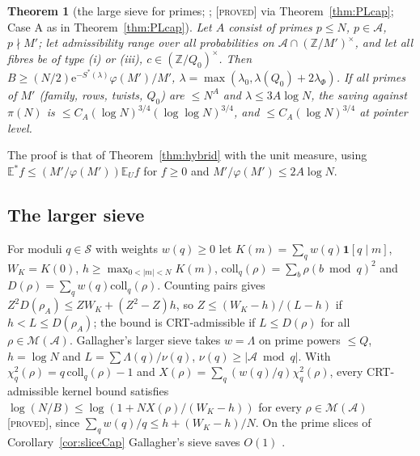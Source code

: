 \documentclass[10pt,reqno]{amsart}
\newtheorem{theorem}{Theorem}[section]
\theoremstyle{definition}
\theoremstyle{remark}
\newcommand{\A}{\mathcal A}
\newcommand{\E}{\mathbb E}
\newcommand{\Z}{\mathbb Z}
\newcommand{\ind}{\mathbf 1}
\newcommand{\e}{\mathrm e}
\newcommand{\lab}[1]{\textup{[\textsc{#1}]}}
\begin{document}
\begin{theorem}[the large sieve for primes; {\cite[Thm~3.1]{LS2}}; \lab{proved} via Theorem~\ref{thm:PLcap}; Case A as in Theorem~\ref{thm:PLcap}]\label{thm:LSprimes}
Let $A$ consist of primes $p\leq N$, $p\in\A$, $p\nmid M'$; let admissibility
range over all probabilities on $\A\cap(\Z/M')^\times$, and let all fibres be of
type (i) or (iii), $c\in(\Z/Q_0)^\times$.  Then
$B\geq(N/2)\e^{-S^*(\lambda)}\varphi(M')/M'$, $\lambda=\max(\lambda_0,\lambda(Q_0)+2\lambda_\Phi)$.  If all
primes of $M'$ (family, rows, twists, $Q_0$) are $\leq N^A$ and $\lambda\leq3A\log N$,
the saving against $\pi(N)$ is $\leq C_A(\log N)^{3/4}(\log\log N)^{3/4}$, and
$\leq C_A(\log N)^{3/4}$ at pointer level.
\end{theorem}
The proof is that of Theorem~\ref{thm:hybrid} with the unit measure, using
$\E^*f\leq(M'/\varphi(M'))\E_Uf$ for $f\geq0$ and $M'/\varphi(M')\leq2A\log N$.

\subsection{The larger sieve}
For moduli $q\in\mathcal S$ with weights $w(q)\geq0$ let $K(m)=\sum_qw(q)\ind[q\mid m]$,
$W_K=K(0)$, $h\geq\max_{0<|m|<N}K(m)$, $\mathrm{coll}_q(\rho)=\sum_b\rho(b\bmod q)^2$ and
$D(\rho)=\sum_qw(q)\mathrm{coll}_q(\rho)$.  Counting pairs gives
$Z^2D(\rho_A)\leq ZW_K+(Z^2-Z)h$, so $Z\leq(W_K-h)/(L-h)$ if $h<L\leq D(\rho_A)$; the
bound is CRT-admissible if $L\leq D(\rho)$ for all $\rho\in\mathcal M(\A)$.
Gallagher's larger sieve \cite{Gallagher} takes $w=\Lambda$ on prime powers
$\leq Q$, $h=\log N$ and $L=\sum\Lambda(q)/\nu(q)$, $\nu(q)\geq|\A\bmod q|$.  With
$\chi^2_q(\rho)=q\,\mathrm{coll}_q(\rho)-1$ and $X(\rho)=\sum_q(w(q)/q)\chi^2_q(\rho)$, every
CRT-admissible kernel bound satisfies
$\log(N/B)\leq\log(1+NX(\rho)/(W_K-h))$ for every $\rho\in\mathcal M(\A)$
\cite[Thm~6.2]{LS} \lab{proved}, since $\sum_qw(q)/q\leq h+(W_K-h)/N$.  On
the prime slices of Corollary~\ref{cor:sliceCap} Gallagher's sieve saves
$O(1)$ \cite[Cor.~6.3]{LS}.
\end{document}
